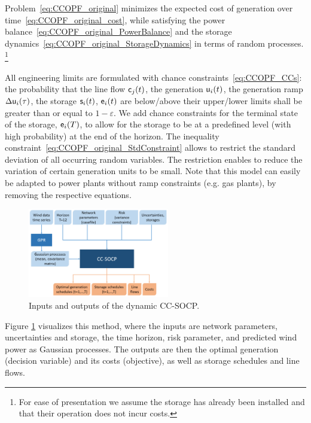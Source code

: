 \documentclass[final,3p,times,twocolumn]{elsarticle}  %
\begin{document}
Problem~\eqref{eq:CCOPF_original} minimizes the expected cost of generation over time~\eqref{eq:CCOPF_original_cost},
while satisfying the power balance~\eqref{eq:CCOPF_original_PowerBalance}
and the storage dynamics~\eqref{eq:CCOPF_original_StorageDynamics} in terms of random processes. %
\footnote{For ease of presentation we assume the storage has already been installed and that their operation does not incur costs.}

All engineering limits are formulated with chance constraints~\eqref{eq:CCOPF_CCs}: the probability that the line flow $\mathsf{c}_j(t)$, the generation $\mathsf{u}_i(t)$, the generation ramp $\Delta\mathsf{u}_i(\tau)$, the storage $\mathsf{s}_i(t)$, $\mathsf{e}_i(t)$ are below/above their upper/lower limits shall be greater than or equal to $1 - \varepsilon$.
We add chance constraints for the terminal state of the storage, $\mathsf{e}_i(T)$, to allow for the storage to be at a predefined level (with high probability) at the end of the horizon. The inequality constraint~\eqref{eq:CCOPF_original_StdConstraint} allows to restrict the standard deviation of all occurring random variables. The restriction enables to reduce the variation of certain generation units to be small. Note that this model can easily be adapted to power plants without ramp constraints (e.g. gas plants), by removing the respective equations.

\begin{figure}
    \centering
    \includegraphics[width=0.55\textwidth]{figures/Input_Output_Model.png}
    \caption{Inputs and outputs of the dynamic CC-SOCP.}
    \label{fig:model_input_output}
\end{figure}

Figure \ref{fig:model_input_output} visualizes this method, where the inputs are network parameters, uncertainties and storage, the time horizon, risk parameter, and predicted wind power as Gaussian processes. The outputs are then the optimal generation (decision variable) and its costs (objective), as well as storage schedules and line flows.
\end{document}

